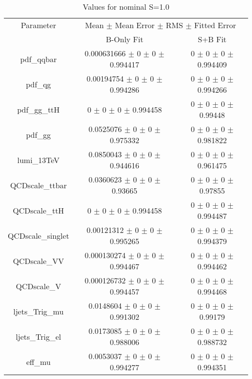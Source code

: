 \begin{table}
\centering
\caption{Values for nominal S=1.0}
\begin{tabular}{ccc}
\toprule
Parameter 	& \multicolumn{2}{c}{Mean $\pm$ Mean Error $\pm$ RMS $\pm$ Fitted Error}\\
 	& B-Only Fit & S+B Fit\\
\midrule
pdf\_qqbar 	& \num{0.000631666} $\pm$ \num{0} $\pm$ \num{0} $\pm$ \num{0.994417} 	& \num{0} $\pm$ \num{0} $\pm$ \num{0} $\pm$ \num{0.994409}\\
pdf\_qg 	& \num{0.00194754} $\pm$ \num{0} $\pm$ \num{0} $\pm$ \num{0.994286} 	& \num{0} $\pm$ \num{0} $\pm$ \num{0} $\pm$ \num{0.994266}\\
pdf\_gg\_ttH 	& \num{0} $\pm$ \num{0} $\pm$ \num{0} $\pm$ \num{0.994458} 	& \num{0} $\pm$ \num{0} $\pm$ \num{0} $\pm$ \num{0.99448}\\
pdf\_gg 	& \num{0.0525076} $\pm$ \num{0} $\pm$ \num{0} $\pm$ \num{0.975332} 	& \num{0} $\pm$ \num{0} $\pm$ \num{0} $\pm$ \num{0.981822}\\
lumi\_13TeV 	& \num{0.0850043} $\pm$ \num{0} $\pm$ \num{0} $\pm$ \num{0.944616} 	& \num{0} $\pm$ \num{0} $\pm$ \num{0} $\pm$ \num{0.961475}\\
QCDscale\_ttbar 	& \num{0.0360623} $\pm$ \num{0} $\pm$ \num{0} $\pm$ \num{0.93665} 	& \num{0} $\pm$ \num{0} $\pm$ \num{0} $\pm$ \num{0.97855}\\
QCDscale\_ttH 	& \num{0} $\pm$ \num{0} $\pm$ \num{0} $\pm$ \num{0.994458} 	& \num{0} $\pm$ \num{0} $\pm$ \num{0} $\pm$ \num{0.994487}\\
QCDscale\_singlet 	& \num{0.00121312} $\pm$ \num{0} $\pm$ \num{0} $\pm$ \num{0.995265} 	& \num{0} $\pm$ \num{0} $\pm$ \num{0} $\pm$ \num{0.994379}\\
QCDscale\_VV 	& \num{0.000130274} $\pm$ \num{0} $\pm$ \num{0} $\pm$ \num{0.994467} 	& \num{0} $\pm$ \num{0} $\pm$ \num{0} $\pm$ \num{0.994462}\\
QCDscale\_V 	& \num{0.000126732} $\pm$ \num{0} $\pm$ \num{0} $\pm$ \num{0.994457} 	& \num{0} $\pm$ \num{0} $\pm$ \num{0} $\pm$ \num{0.994468}\\
ljets\_Trig\_mu 	& \num{0.0148604} $\pm$ \num{0} $\pm$ \num{0} $\pm$ \num{0.991302} 	& \num{0} $\pm$ \num{0} $\pm$ \num{0} $\pm$ \num{0.99179}\\
ljets\_Trig\_el 	& \num{0.0173085} $\pm$ \num{0} $\pm$ \num{0} $\pm$ \num{0.988006} 	& \num{0} $\pm$ \num{0} $\pm$ \num{0} $\pm$ \num{0.988732}\\
eff\_mu 	& \num{0.0053037} $\pm$ \num{0} $\pm$ \num{0} $\pm$ \num{0.994277} 	& \num{0} $\pm$ \num{0} $\pm$ \num{0} $\pm$ \num{0.994351}\\

\end{tabular}
\end{table}
